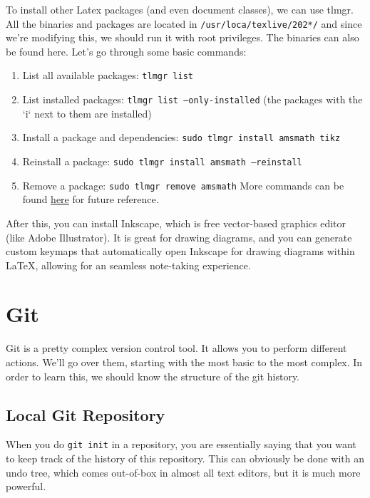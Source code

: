 \documentclass{article}
\begin{document}
  To install other Latex packages (and even document classes), we can use tlmgr. All the binaries and packages are located in \texttt{/usr/loca/texlive/202*/} and since we're modifying this, we should run it with root privileges. The binaries can also be found here. Let's go through some basic commands: 
  \begin{enumerate}
    \item List all available packages: \texttt{tlmgr list}
    \item List installed packages: \texttt{tlmgr list --only-installed} (the packages with the `i` next to them are installed)
    \item Install a package and dependencies: \texttt{sudo tlmgr install amsmath tikz} 
    \item Reinstall a package: \texttt{sudo tlmgr install amsmath --reinstall}
    \item Remove a package: \texttt{sudo tlmgr remove amsmath} 
  More commands can be found \href{http://tug.ctan.org/info/tlmgrbasics/doc/tlmgr.pdf}{here} for future reference.  
  \end{enumerate}

  After this, you can install Inkscape, which is free vector-based graphics editor (like Adobe Illustrator). It is great for drawing diagrams, and you can generate custom keymaps that automatically open Inkscape for drawing diagrams within LaTeX, allowing for an seamless note-taking experience.  

\section{Git} 

    Git is a pretty complex version control tool. It allows you to perform different actions. We'll go over them, starting with the most basic to the most complex. In order to learn this, we should know the structure of the git history. 

  \subsection{Local Git Repository} 

    When you do \texttt{git init} in a repository, you are essentially saying that you want to keep track of the history of this repository. This can obviously be done with an undo tree, which comes out-of-box in almost all text editors, but it is much more powerful. 
\end{document}
